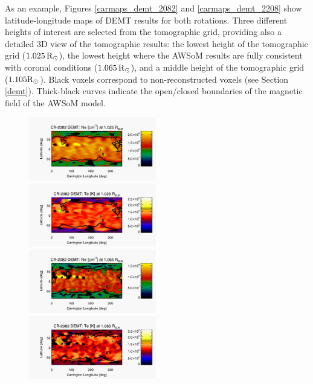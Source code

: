 \documentclass[namedreferences]{solarphysics}
\newcommand{\mrsun}{{\rm R_\odot}}
\begin{document}
\begin{article}
{As an example,} Figures \ref{carmaps_demt_2082} and \ref{carmaps_demt_2208} show {latitude-longitude} maps of DEMT results for both {rotations. Three different heights {of interest are selected from the tomographic grid}, providing also a detailed 3D view of the tomographic results: the lowest height of {the} tomographic grid ($1.025\,\mrsun$), {the lowest height where the AWSoM results are fully} consistent with coronal conditions ($1.065\,\mrsun$), and a middle height of the tomographic grid ($1.105\mrsun$)}. Black voxels correspond to non-reconstructed voxels ({see} Section \ref{demt}). Thick-black {curves indicate} the {open/closed boundaries of the magnetic field of the} AWSoM model. 

\begin{figure}[h!]
\begin{center}
\includegraphics[width=0.495\textwidth]{figs/map_Ne_CR2082_DEMT-EUVI_behind_H1-L3523_r3d_1025_Rsun.pdf}
\includegraphics[width=0.495\textwidth]{figs/map_Tm_CR2082_DEMT-EUVI_behind_H1-L3523_r3d_1025_Rsun.pdf}
\includegraphics[width=0.495\textwidth]{figs/map_Ne_CR2082_DEMT-EUVI_behind_H1-L3523_r3d_1065_Rsun.pdf}
\includegraphics[width=0.495\textwidth]{figs/map_Tm_CR2082_DEMT-EUVI_behind_H1-L3523_r3d_1065_Rsun.pdf}

\end{center}
\end{figure}
\end{article}
\end{document}
